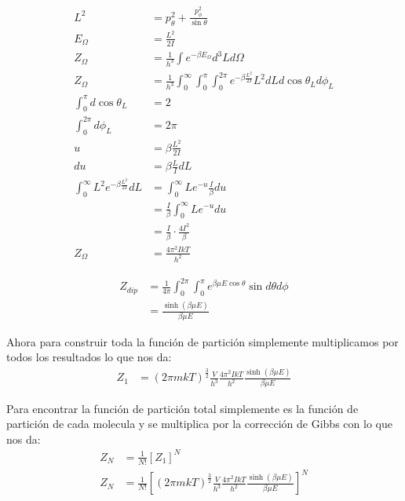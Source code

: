 \documentclass{report}
\begin{document}
\begin{align*}
	L^2 &= p_\theta^2 + \frac{p^2_\phi}{\sin \theta}\\
	E_\Omega &= \frac{L^2}{2I}\\
	Z_\Omega &= \frac{1}{h^3}\int e^{-\beta E_\Omega} d^3L d\Omega\\
	Z_\Omega &= \frac{1}{h^3}\int_0^\infty \int_0^\pi \int_0^{2\pi} e^{-\beta \frac{L^2}{2I}} L^2 dLd\cos\theta_L d\phi_L\\
	\int_0^{\pi} d\cos\theta_L &= 2\\
	\int_0^{2\pi} d\phi_L &= 2\pi\\
	u &= \beta \frac{L^2}{2I}\\
	du &= \beta \frac{L}{I} dL\\
	\int_0^\infty L^2 e^{-\beta \frac{L^2}{2I}}dL &= \int_0^\infty L e^{-u}\frac{I}{\beta} du\\
	&= \frac{I}{\beta}\int_0^\infty L e^{-u} du\\
	&= \frac{I}{\beta} \cdot \frac{4I^2}{\beta}\\
	Z_\Omega &= \frac{4\pi^2 IkT}{h^2}
\end{align*}

\begin{align*}
	Z_{dip} &= \frac{1}{4\pi}\int_0^{2\pi}\int_0^\pi e^{\beta \mu E\cos\theta} \sin d\theta d\phi\\
	&= \frac{\sinh \left( \beta\mu E \right)}{\beta \mu E}
\end{align*}

Ahora para construir toda la función de partición simplemente multiplicamos por todos los resultados lo que nos da:
\begin{align*}
	Z_1 &= \left( 2\pi m k T \right)^{\frac{3}{2}} \frac{V}{h^3} \frac{4\pi^2 IkT}{h^2} \frac{\sinh \left( \beta\mu E \right)}{\beta \mu E}
\end{align*}

Para encontrar la función de partición total simplemente es la función de partición de cada molecula y se multiplica por la corrección de Gibbs con lo que nos da:
\begin{align*}
	Z_N &= \frac{1}{N!} \left[ Z_1 \right]^N\\
	Z_N &= \frac{1}{N!} \left[ \left( 2\pi m k T \right)^{\frac{3}{2}} \frac{V}{h^3} \frac{4\pi^2 IkT}{h^2} \frac{\sinh \left( \beta\mu E \right)}{\beta \mu E} \right]^N
\end{align*}

\section{}
\end{document}
